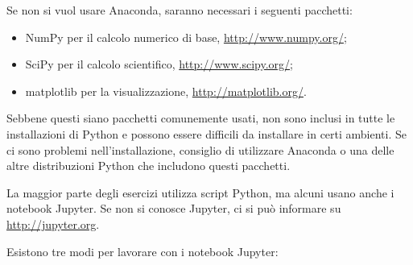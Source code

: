 \documentclass[12pt,a4paper]{book}
\begin{document}
Se non si vuol usare Anaconda, saranno necessari i seguenti pacchetti:

\begin{itemize} 

\item NumPy per il calcolo numerico di base, \url{http://www.numpy.org/};  

\item SciPy per il calcolo scientifico, \url{http://www.scipy.org/};  

\item matplotlib per la visualizzazione, \url{http://matplotlib.org/}.  

\end{itemize} 

Sebbene questi siano pacchetti comunemente usati, non sono inclusi in tutte le installazioni di Python e possono essere difficili da installare in certi ambienti. Se ci sono problemi nell'installazione, consiglio di utilizzare Anaconda o una delle altre distribuzioni Python che includono questi pacchetti.  

La maggior parte degli esercizi utilizza script Python, ma alcuni usano anche i notebook Jupyter. Se non si conosce Jupyter, ci si può informare su \url{http://jupyter.org}.  

Esistono tre modi per lavorare con i notebook Jupyter:
\end{document}
